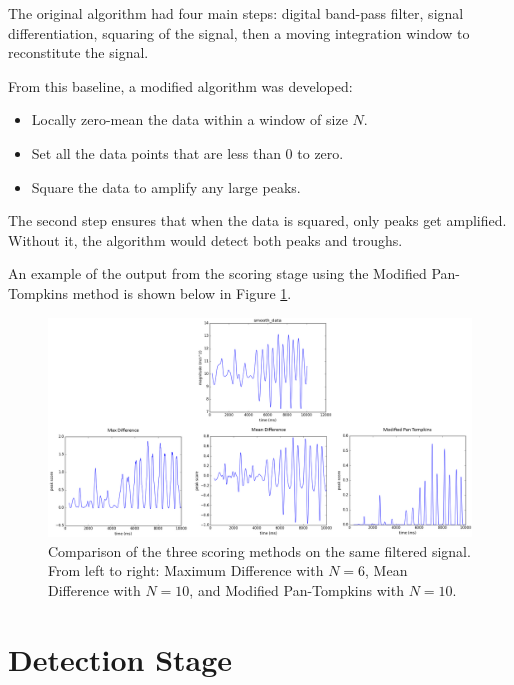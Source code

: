                 The original algorithm had four main steps: digital band-pass filter, signal differentiation, squaring of the signal, then a moving integration window to reconstitute the signal.

                From this baseline, a modified algorithm was developed:

                \begin{itemize}
                    \item Locally zero-mean the data within a window of size $N$.
                    \item Set all the data points that are less than 0 to zero.
                    \item Square the data to amplify any large peaks.
                \end{itemize}

                The second step ensures that when the data is squared, only peaks get amplified. Without it, the algorithm would detect both peaks and troughs.

                An example of the output from the scoring stage using the Modified Pan-Tompkins method is shown below in Figure \ref{img_compare_scoring}.

                \begin{figure}[!th]
                    \includegraphics[width=\textwidth]{Images/compare_scoring.png}
                    \centering
                    \caption{Comparison of the three scoring methods on the same filtered signal. From left to right: Maximum Difference with $N=6$, Mean Difference with $N=10$, and Modified Pan-Tompkins with $N=10$.}
                    \label{img_compare_scoring}
                \end{figure}


        \section{Detection Stage}

